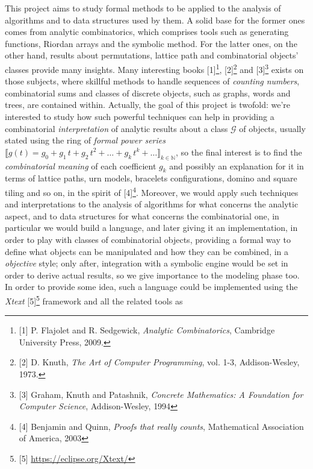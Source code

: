 
\noindent This project aims to study formal methods to be applied to the
analysis of algorithms and to data structures used by them.
A solid base for
the former ones comes from analytic combinatorics, which comprises tools
such as generating functions, Riordan arrays and the symbolic method.
For the latter ones, on the other hand, results about permutations,
lattice path and combinatorial objects' classes provide many insights.
Many interesting books  [1]\footnote{[1] P. Flajolet and R. Sedgewick,
\emph{Analytic Combinatorics}, Cambridge University Press, 2009.},
[2]\footnote{[2] D. Knuth, \emph{The Art of Computer Programming}, vol.
1-3, Addison-Wesley, 1973.} and [3]\footnote{[3] Graham, Knuth and
Patashnik, \emph{Concrete Mathematics: A Foundation for Computer
Science}, Addison-Wesley, 1994} exists on those subjects, where skillful
methods to handle sequences of \emph{counting numbers}, combinatorial
sums and classes of discrete objects, such as graphs, words and trees,
are contained within. Actually, the goal of this project is
twofold: we're interested to study how
such powerful techniques can help in providing a combinatorial
\emph{interpretation} of analytic results about a class $\mathcal{G}$ of
objects, usually stated using the ring of \emph{formal power series}
$\llbracket g(t)=g_{0}+g_{1}\,t+
g_{2}\,t^{2}+\ldots+g_{k}\,t^{k}+\ldots\rrbracket_{k\in\mathbb{N}}$, so
the final interest is to find the \emph{combinatorial meaning} of each
coefficient $g_{k}$ and possibly an explanation for it in terms of
lattice paths, urn models, bracelets configurations, domino and square
tiling and so on, in the spirit of [4]\footnote{[4] Benjamin and Quinn,
\emph{Proofs that really counts}, Mathematical Association of America,
2003}. Moreover, we would apply such techniques and interpretations to
the analysis of algorithms for what concerns the analytic aspect, and to
data structures for what concerns the combinatorial one, in particular
we would build a language, and later giving it an implementation, in order to play with
classes of combinatorial objects, providing a formal way to define what
objects can be manipulated and how they can be combined, in a
\emph{objective} style; only after, integration with a symbolic engine
would be set in order to derive actual results, so we give importance to
the modeling phase too. In order to provide some idea, such a language
could be implemented using the \emph{Xtext} [5]\footnote{[5]
\url{https://eclipse.org/Xtext/}} framework and all the related tools as
